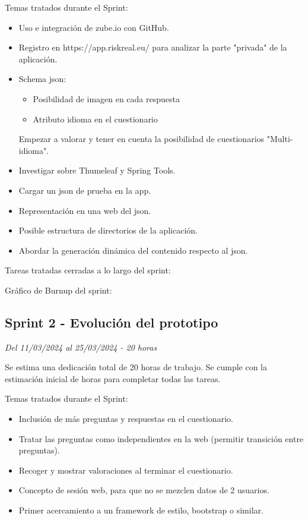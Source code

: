 Temas tratados durante el Sprint:

\begin{itemize}
	\item
	Uso e integración de zube.io con GitHub.
	\item
	Registro en https://app.riskreal.eu/ para analizar la parte "privada" de la aplicación.
	\item
	Schema json:
	\begin{itemize}
		\item
		Posibilidad de imagen en cada respuesta
		\item
		Atributo idioma en el cuestionario
	\end{itemize}
	Empezar a valorar y tener en cuenta la posibilidad de cuestionarios "Multi-idioma".
	\item
	Investigar sobre Thumeleaf y Spring Tools.
	\item
	Cargar un json de prueba en la app.
	\item
	Representación en una web del json.
	\item
	Posible estructura de directorios de la aplicación.
	\item
	Abordar la generación dinámica del contenido respecto al json.
\end{itemize}

Tareas tratadas cerradas a lo largo del sprint:

Gráfico de Burnup del sprint:


\subsection{Sprint 2 - Evolución del prototipo}
\textit{Del 11/03/2024 al 25/03/2024 - 20 horas}

Se estima una dedicación total de 20 horas de trabajo.
Se cumple con la estimación inicial de horas para completar todas las tareas.

Temas tratados durante el Sprint:

\begin{itemize}
	\item
	Inclusión de más preguntas y respuestas en el cuestionario.
	\item
	Tratar las preguntas como independientes en la web (permitir transición entre preguntas).
	\item
	Recoger y mostrar valoraciones al terminar el cuestionario.
	\item
	Concepto de sesión web, para que no se mezclen datos de 2 usuarios.
	\item
	Primer acercamiento a un framework de estilo, bootstrap o similar.
\end{itemize}

